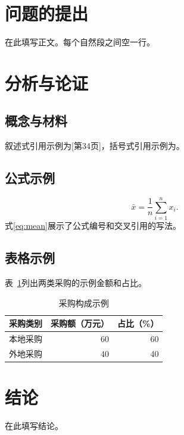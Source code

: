 \documentclass{jingyan}
\begin{document}

\section{问题的提出}
在此填写正文。每个自然段之间空一行。

\section{分析与论证}
\subsection{概念与材料}
叙述式引用示例为[第34页]，括号式引用示例为。

\subsection{公式示例}
\begin{equation}\label{eq:mean}
  \bar{x}=\frac{1}{n}\sum_{i=1}^{n}x_i.
\end{equation}
式\eqref{eq:mean}展示了公式编号和交叉引用的写法。

\subsection{表格示例}
表~\ref{tab:procurement}列出两类采购的示例金额和占比。

\begin{table}[htbp]
  \centering
  \small
  \setlength{\belowcaptionskip}{4pt}
  \caption{采购构成示例}
  \label{tab:procurement}
  \begin{tabular}{lrr}
    \toprule
    采购类别 & 采购额（万元） & 占比（\%） \\
    \midrule
    本地采购 & 60 & 60 \\
    外地采购 & 40 & 40 \\
    \bottomrule
  \end{tabular}
\end{table}

\section{结论}
在此填写结论。

\begin{References}
\end{References}
\end{document}
